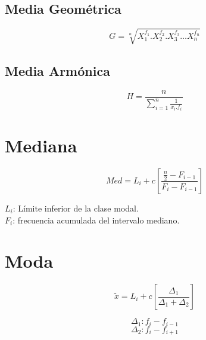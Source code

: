     \begin{minipage}[b]{\textwidth}
\begin{minipage}[b]{0.5 \textwidth}

\subsection{Media Geométrica}
    \begin{equation*}
G=\sqrt [ n ]{ { X }_{ 1 }^{ { f }_{ 1 } }.{ X }_{ 2 }^{ { f }_{ 2 } }.{ X }_{ 3 }^{ { f }_{ 3 } }\dots { X }_{ n}^{ { f }_{ n} } } 
    \end{equation*}
    
     \end{minipage} \hfill \begin{minipage}[b]{0.5 \textwidth}
\subsection{Media Armónica}
\begin{equation*}
H=\frac { n }{ \sum _{ i=1 }^{ n }{ \frac { 1 }{ x_{ i }.{ f }_{ i } }  }  }
\end{equation*}
    \end{minipage}
    \end{minipage}

\section{Mediana}
\begin{minipage}[t]{0.5\textwidth}
	\begin{equation*}
Med={ L }_{ i }+c\left[ \frac { \frac { n }{ 2 } -{ F }_{ i-1 } }{ { F }_{ i }-{ F }_{ i-1 } }  \right] 
	\end{equation*}
 \end{minipage} \hfill \begin{minipage}[t]{0.5\textwidth}
 ${L}_{i}$: Límite inferior de la clase modal. \\
 ${F}_{i}$: frecuencia acumulada del intervalo mediano.
 \end{minipage}
 
\section{Moda}
\begin{minipage}[t]{0.5\textwidth}
	\begin{equation*}
\tilde { x } ={ L }_{ i }+c\left[ \frac { { \Delta  }_{ 1 } }{ { \Delta  }_{ 1 }+{ \Delta  }_{ 2 } }  \right] 
 \end{equation*}
 \end{minipage} \hfill \begin{minipage}[t]{0.5\textwidth}
	\begin{equation*}
{ \Delta  }_{ 1 }: f_{ i }-f_{ i-1 }
	\end{equation*}
	\begin{equation*}
{ \Delta  }_{ 2 }: f_{ i }-f_{ i+1 }
	\end{equation*}


\end{minipage}